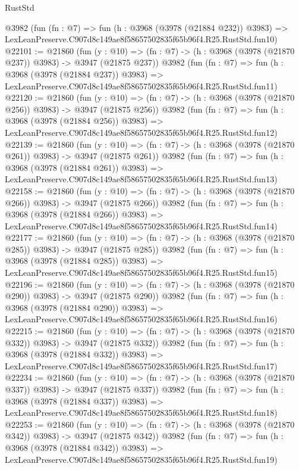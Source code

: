 \begin{lexlean}{RustStd}
\begin{coremodule}
    @3982
    (fun (fn : @7) =>
    fun (h : @3968 (@3978 (@21884 @232)) @3983) =>
    LexLeanPreserve.C907d8c149ae8f58657502835f65b96f4.R25.RustStd.fun10)
@22101 := @21860
    (fun (y : @10) => (fn : @7) -> (h : @3968 (@3978 (@21870 @237)) @3983) -> @3947 (@21875 @237))
    @3982
    (fun (fn : @7) =>
    fun (h : @3968 (@3978 (@21884 @237)) @3983) =>
    LexLeanPreserve.C907d8c149ae8f58657502835f65b96f4.R25.RustStd.fun11)
@22120 := @21860
    (fun (y : @10) => (fn : @7) -> (h : @3968 (@3978 (@21870 @256)) @3983) -> @3947 (@21875 @256))
    @3982
    (fun (fn : @7) =>
    fun (h : @3968 (@3978 (@21884 @256)) @3983) =>
    LexLeanPreserve.C907d8c149ae8f58657502835f65b96f4.R25.RustStd.fun12)
@22139 := @21860
    (fun (y : @10) => (fn : @7) -> (h : @3968 (@3978 (@21870 @261)) @3983) -> @3947 (@21875 @261))
    @3982
    (fun (fn : @7) =>
    fun (h : @3968 (@3978 (@21884 @261)) @3983) =>
    LexLeanPreserve.C907d8c149ae8f58657502835f65b96f4.R25.RustStd.fun13)
@22158 := @21860
    (fun (y : @10) => (fn : @7) -> (h : @3968 (@3978 (@21870 @266)) @3983) -> @3947 (@21875 @266))
    @3982
    (fun (fn : @7) =>
    fun (h : @3968 (@3978 (@21884 @266)) @3983) =>
    LexLeanPreserve.C907d8c149ae8f58657502835f65b96f4.R25.RustStd.fun14)
@22177 := @21860
    (fun (y : @10) => (fn : @7) -> (h : @3968 (@3978 (@21870 @285)) @3983) -> @3947 (@21875 @285))
    @3982
    (fun (fn : @7) =>
    fun (h : @3968 (@3978 (@21884 @285)) @3983) =>
    LexLeanPreserve.C907d8c149ae8f58657502835f65b96f4.R25.RustStd.fun15)
@22196 := @21860
    (fun (y : @10) => (fn : @7) -> (h : @3968 (@3978 (@21870 @290)) @3983) -> @3947 (@21875 @290))
    @3982
    (fun (fn : @7) =>
    fun (h : @3968 (@3978 (@21884 @290)) @3983) =>
    LexLeanPreserve.C907d8c149ae8f58657502835f65b96f4.R25.RustStd.fun16)
@22215 := @21860
    (fun (y : @10) => (fn : @7) -> (h : @3968 (@3978 (@21870 @332)) @3983) -> @3947 (@21875 @332))
    @3982
    (fun (fn : @7) =>
    fun (h : @3968 (@3978 (@21884 @332)) @3983) =>
    LexLeanPreserve.C907d8c149ae8f58657502835f65b96f4.R25.RustStd.fun17)
@22234 := @21860
    (fun (y : @10) => (fn : @7) -> (h : @3968 (@3978 (@21870 @337)) @3983) -> @3947 (@21875 @337))
    @3982
    (fun (fn : @7) =>
    fun (h : @3968 (@3978 (@21884 @337)) @3983) =>
    LexLeanPreserve.C907d8c149ae8f58657502835f65b96f4.R25.RustStd.fun18)
@22253 := @21860
    (fun (y : @10) => (fn : @7) -> (h : @3968 (@3978 (@21870 @342)) @3983) -> @3947 (@21875 @342))
    @3982
    (fun (fn : @7) =>
    fun (h : @3968 (@3978 (@21884 @342)) @3983) =>
    LexLeanPreserve.C907d8c149ae8f58657502835f65b96f4.R25.RustStd.fun19)

\end{coremodule}
\end{lexlean}
